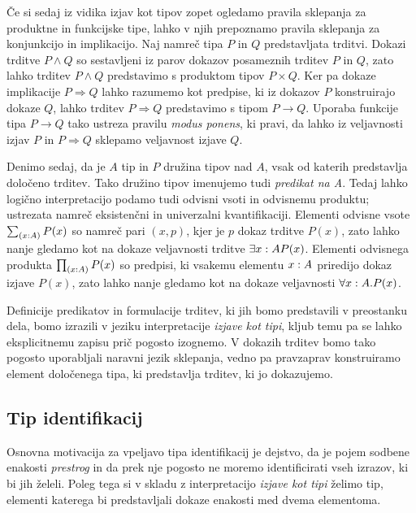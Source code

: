 Če si sedaj iz vidika izjav kot tipov zopet ogledamo pravila sklepanja za produktne in
funkcijske tipe, lahko v njih prepoznamo pravila sklepanja za konjunkcijo in implikacijo. Naj namreč tipa \(P\) in \(Q\) predstavljata trditvi.
Dokazi trditve \(P \wedge Q\) so sestavljeni
iz parov dokazov posameznih trditev \(P\) in \(Q\), zato lahko trditev \(P \wedge Q\) predstavimo s produktom tipov \(P \times Q\). Ker pa dokaze implikacije \(P \Rightarrow Q\) lahko razumemo kot predpise, ki iz dokazov \(P\) konstruirajo dokaze \(Q\), lahko trditev \(P \Rightarrow Q\) predstavimo s tipom \(P \to Q\). Uporaba funkcije tipa \(P \to Q\)
tako ustreza pravilu \emph{modus ponens}, ki pravi, da lahko iz veljavnosti izjav \(P\) in \(P \Rightarrow Q\) sklepamo veljavnost izjave \(Q\).

Denimo sedaj, da je \(A\) tip in \(P\) družina tipov nad \(A\), vsak od katerih predstavlja določeno trditev. Tako družino tipov imenujemo tudi \emph{predikat na A}.
Tedaj lahko logično interpretacijo podamo tudi odvisni vsoti in odvisnemu produktu;
ustrezata namreč eksistenčni in univerzalni kvantifikaciji. Elementi odvisne vsote
\(\textstyle \sum_{\left( x : A \right)} P(x)\) so namreč pari \((x, p)\), kjer je \(p\) dokaz trditve \(P(x)\), zato lahko nanje gledamo kot na dokaze veljavnosti trditve \(\exists x : A P(x)\). Elementi odvisnega produkta
\(\textstyle \prod_{\left( x : A \right)} P(x)\) so predpisi, ki vsakemu elementu \(x : A\) priredijo
dokaz izjave \(P(x)\), zato lahko nanje gledamo kot na dokaze veljavnosti
\(\forall x : A.P(x)\).

Definicije predikatov in formulacije trditev, ki jih bomo predstavili v preostanku dela, bomo
izrazili v jeziku interpretacije \emph{izjave kot tipi}, kljub temu pa se lahko eksplicitnemu
zapisu prič pogosto izognemo. V dokazih trditev bomo tako pogosto uporabljali naravni
jezik sklepanja, vedno pa pravzaprav konstruiramo element določenega tipa, ki predstavlja trditev, ki jo dokazujemo.

\subsection{Tip identifikacij}
Osnovna motivacija za vpeljavo tipa identifikacij je dejstvo, da je pojem sodbene enakosti
\emph{prestrog} in da prek nje pogosto ne moremo identificirati vseh izrazov, ki bi
jih želeli. Poleg tega si v skladu z interpretacijo \emph{izjave kot tipi} želimo tip, elementi
katerega bi predstavljali dokaze enakosti med dvema elementoma.


